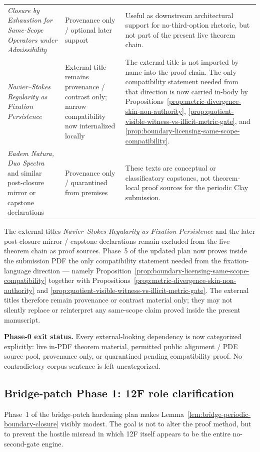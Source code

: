 \begin{center}
\begin{tabularx}{0.98\textwidth}{@{}L{0.32\textwidth}L{0.22\textwidth}Y@{}}
\emph{Closure by Exhaustion for Same-Scope Operators under Admissibility} & Provenance only / optional later support & Useful as downstream architectural support for no-third-option rhetoric, but not part of the present live theorem chain.\\
\emph{Navier--Stokes Regularity as Fixation Persistence} & External title remains provenance / contrast only; narrow compatibility now internalized locally & The external title is not imported by name into the proof chain. The only compatibility statement needed from that direction is now carried in-body by Propositions~\ref{prop:metric-divergence-skin-non-authority}, \ref{prop:quotient-visible-witness-vs-illicit-metric-gate}, and \ref{prop:boundary-licensing-same-scope-compatibility}.\\
\emph{Eadem Natura, Duo Spectra} and similar post-closure mirror or capstone declarations & Provenance only / quarantined from premises & These texts are conceptual or classificatory capstones, not theorem-local proof sources for the periodic Clay submission.\\
\bottomrule
\end{tabularx}
\end{center}

\begin{remark}
The external titles \emph{Navier--Stokes Regularity as Fixation Persistence} and the later post-closure mirror / capstone declarations remain excluded from the live theorem chain as proof sources. Phase~5 of the updated plan now proves inside the submission PDF the only compatibility statement needed from the fixation-language direction --- namely Proposition~\ref{prop:boundary-licensing-same-scope-compatibility} together with Propositions~\ref{prop:metric-divergence-skin-non-authority} and \ref{prop:quotient-visible-witness-vs-illicit-metric-gate}. The external titles therefore remain provenance or contrast material only; they may not silently replace or reinterpret any same-scope claim proved inside the present manuscript.
\end{remark}

\noindent\textbf{Phase-0 exit status.} Every external-looking dependency is now categorized explicitly: live in-PDF theorem material, permitted public alignment / PDE source pool, provenance only, or quarantined pending compatibility proof. No contradictory corpus sentence is left uncategorized.

\subsection*{Bridge-patch Phase 1: 12F role clarification}
Phase~1 of the bridge-patch hardening plan makes Lemma~\ref{lem:bridge-periodic-boundary-closure} visibly modest. The goal is not to alter the proof method, but to prevent the hostile misread in which 12F itself appears to be the entire no-second-gate engine.

